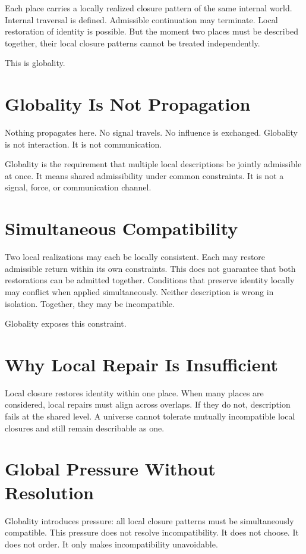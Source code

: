 \documentclass[11pt,twoside,openright]{book}
\begin{document}
Each place carries a locally realized closure pattern of the same internal world. Internal traversal is defined. Admissible continuation may terminate. Local restoration of identity is possible. But the moment two places must be described together, their local closure patterns cannot be treated independently.

This is globality.

\section*{Globality Is Not Propagation}

Nothing propagates here. No signal travels. No influence is exchanged. Globality is not interaction. It is not communication.

Globality is the requirement that multiple local descriptions be jointly admissible at once. It means shared admissibility under common constraints. It is not a signal, force, or communication channel.

\section*{Simultaneous Compatibility}

Two local realizations may each be locally consistent. Each may restore admissible return within its own constraints. This does not guarantee that both restorations can be admitted together. Conditions that preserve identity locally may conflict when applied simultaneously. Neither description is wrong in isolation. Together, they may be incompatible.

Globality exposes this constraint.

\section*{Why Local Repair Is Insufficient}

Local closure restores identity within one place. When many places are considered, local repairs must align across overlaps. If they do not, description fails at the shared level. A universe cannot tolerate mutually incompatible local closures and still remain describable as one.

\section*{Global Pressure Without Resolution}

Globality introduces pressure: all local closure patterns must be simultaneously compatible. This pressure does not resolve incompatibility. It does not choose. It does not order. It only makes incompatibility unavoidable.
\end{document}
